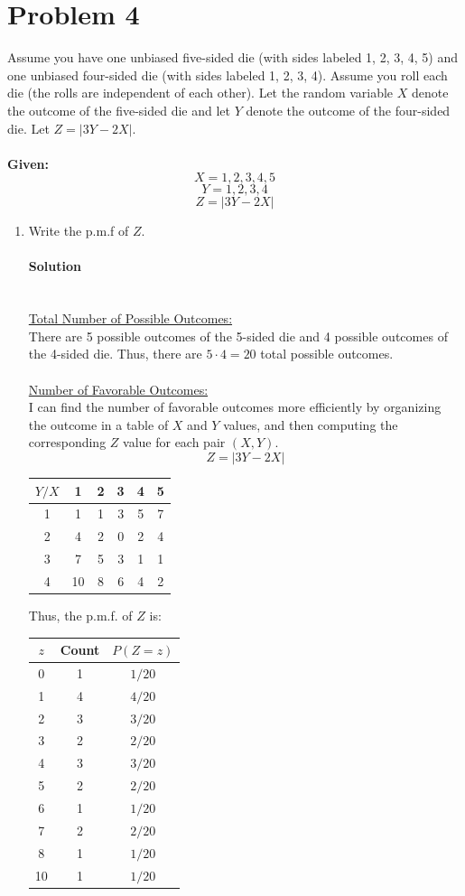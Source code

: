 ﻿\documentclass[12pt]{article}
\begin{document}
\section*{Problem 4}
Assume you have one unbiased five-sided die (with sides labeled 1, 2, 3, 4, 5) and one unbiased four-sided die (with sides labeled 1, 2, 3, 4). Assume you roll each die (the rolls are independent of each other). Let the random variable $X$ denote the outcome of the five-sided die and let $Y$ denote the outcome of the four-sided die. Let $Z = |3Y - 2X|$.\\\\
\textbf{Given:}
\[X = {1,2,3,4,5}\]
\[Y = {1,2,3,4}\]
\[Z = |3Y - 2X|\]
\newpage
\begin{enumerate}[label=(\alph*), leftmargin=*]
\item Write the p.m.f of $Z$.
\paragraph{Solution}\mbox{}\\
\underline{Total Number of Possible Outcomes:}\\
There are 5 possible outcomes of the 5-sided die and 4 possible outcomes of the 4-sided die. Thus, there are $5\cdot 4 = 20$ total possible outcomes.\\\\
\underline{Number of Favorable Outcomes:}\\
I can find the number of favorable outcomes more efficiently by organizing the outcome in a table of $X$ and $Y$ values, and then computing the corresponding $Z$ value for each pair $(X,Y)$.
\[
Z = |3Y - 2X|
\]
\begin{center}
\begin{tabular}{c|ccccc}
\hline
$Y / X$ & 1 & 2 & 3 & 4 & 5 \\
\hline
1 & 1  & 1 & 3 & 5 & 7 \\
2 & 4  & 2 & 0 & 2 & 4 \\
3 & 7  & 5 & 3 & 1 & 1 \\
4 & 10 & 8 & 6 & 4 & 2 \\
\hline
\end{tabular}
\end{center}
Thus, the p.m.f. of $Z$ is:
\begin{center}
\begin{tabular}{c|cc}
\hline
$z$ & Count & $P(Z=z)$ \\
\hline
0  & 1 & $1/20$ \\
1  & 4 & $4/20$ \\
2  & 3 & $3/20$ \\
3  & 2 & $2/20$ \\
4  & 3 & $3/20$ \\
5  & 2 & $2/20$ \\
6  & 1 & $1/20$ \\
7  & 2 & $2/20$ \\
8  & 1 & $1/20$ \\
10 & 1 & $1/20$ \\
\hline
\end{tabular}
\end{center}

\end{enumerate}
\end{document}
